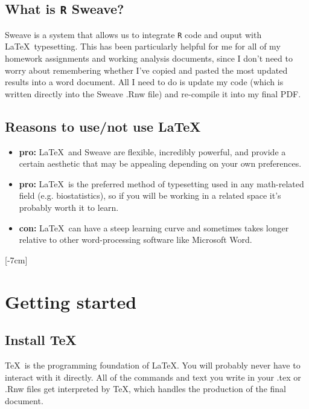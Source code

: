 \documentclass[11pt]{article}\usepackage[]{graphicx}\usepackage[]{color}
\begin{document}
\subsection{What is \texttt{R} Sweave?}

Sweave is a system that allows us to integrate \texttt{R} code and ouput with \LaTeX\ typesetting. This has been particularly helpful for me for all of my homework assignments and working analysis documents, since I don't need to worry about remembering whether I've copied and pasted the most updated results into a word document. All I need to do is update my code (which is written directly into the Sweave .Rnw file) and re-compile it into my final PDF. 

\subsection{Reasons to use/not use \LaTeX\ }

\begin{itemize}
  \item \textbf{pro: }\LaTeX\ and Sweave are flexible, incredibly powerful, and provide a certain aesthetic that may be appealing depending on your own preferences. 
  \item \textbf{pro: }\LaTeX\ is the preferred method of typesetting used in any math-related field (e.g. biostatistics), so if you will be working in a related space it's probably worth it to learn.
  \item \textbf{con: }\LaTeX\ can have a steep learning curve and sometimes takes longer relative to other word-processing software like Microsoft Word. 
\end{itemize}

[-7cm]

\pagebreak
\section{Getting started}


\subsection{Install \TeX\ }

\TeX\ is the programming foundation of \LaTeX. You will probably never have to interact with it directly. All of the commands and text you write in your .tex or .Rnw files get interpreted by \TeX, which handles the production of the final document. 
\end{document}
